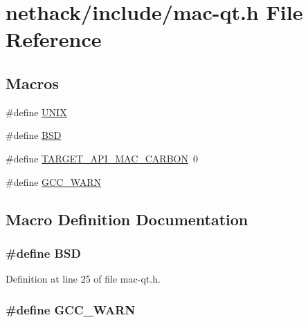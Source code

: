 \hypertarget{mac-qt_8h}{\section{nethack/include/mac-\/qt.h File Reference}
\label{mac-qt_8h}
}
\subsection*{Macros}
\begin{DoxyCompactItemize}
\item 
\#define \hyperlink{mac-qt_8h_a2dafe4a81445873e5c3cb0dff7741429}{U\+N\+I\+X}
\item 
\#define \hyperlink{mac-qt_8h_a2556878dbcc782a166b875e9cd9ad969}{B\+S\+D}
\item 
\#define \hyperlink{mac-qt_8h_a8601b9b36b5d7d40e6d42c0e04dd936c}{T\+A\+R\+G\+E\+T\+\_\+\+A\+P\+I\+\_\+\+M\+A\+C\+\_\+\+C\+A\+R\+B\+O\+N}~0
\item 
\#define \hyperlink{mac-qt_8h_a92b0d5b27a6885d223fdad4315cc49c1}{G\+C\+C\+\_\+\+W\+A\+R\+N}
\end{DoxyCompactItemize}


\subsection{Macro Definition Documentation}
\hypertarget{mac-qt_8h_a2556878dbcc782a166b875e9cd9ad969}{
\subsubsection[{B\+S\+D}]{\setlength{\rightskip}{0pt plus 5cm}\#define B\+S\+D}}\label{mac-qt_8h_a2556878dbcc782a166b875e9cd9ad969}


Definition at line 25 of file mac-\/qt.\+h.

\hypertarget{mac-qt_8h_a92b0d5b27a6885d223fdad4315cc49c1}{
\subsubsection[{G\+C\+C\+\_\+\+W\+A\+R\+N}]{\setlength{\rightskip}{0pt plus 5cm}\#define G\+C\+C\+\_\+\+W\+A\+R\+N}}\label{mac-qt_8h_a92b0d5b27a6885d223fdad4315cc49c1}


